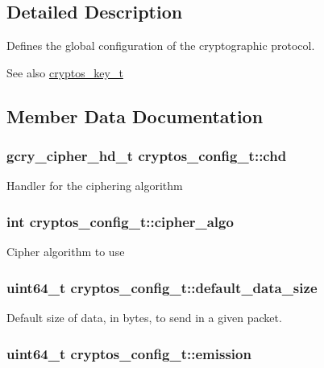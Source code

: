 \subsection{Detailed Description}
Defines the global configuration of the cryptographic protocol. \begin{DoxySeeAlso}{See also}
\hyperlink{structcryptos__key__t}{cryptos\_\-key\_\-t} 
\end{DoxySeeAlso}


\subsection{Member Data Documentation}
\hypertarget{structcryptos__config__t_a07ceae1485d08d3ef32dd276c1822860}{
\subsubsection[{chd}]{\setlength{\rightskip}{0pt plus 5cm}gcry\_\-cipher\_\-hd\_\-t {\bf cryptos\_\-config\_\-t::chd}}}
\label{structcryptos__config__t_a07ceae1485d08d3ef32dd276c1822860}
Handler for the ciphering algorithm \hypertarget{structcryptos__config__t_a235962cb863bfd75cb837814bd86cef4}{
\subsubsection[{cipher\_\-algo}]{\setlength{\rightskip}{0pt plus 5cm}int {\bf cryptos\_\-config\_\-t::cipher\_\-algo}}}
\label{structcryptos__config__t_a235962cb863bfd75cb837814bd86cef4}
Cipher algorithm to use \hypertarget{structcryptos__config__t_adb53007d66d9e4258ba5765958df794b}{
\subsubsection[{default\_\-data\_\-size}]{\setlength{\rightskip}{0pt plus 5cm}uint64\_\-t {\bf cryptos\_\-config\_\-t::default\_\-data\_\-size}}}
\label{structcryptos__config__t_adb53007d66d9e4258ba5765958df794b}
Default size of data, in bytes, to send in a given packet. \hypertarget{structcryptos__config__t_a201dba03c6609d57a8c2949496e52cdf}{
\subsubsection[{emission}]{\setlength{\rightskip}{0pt plus 5cm}uint64\_\-t {\bf cryptos\_\-config\_\-t::emission}}}
